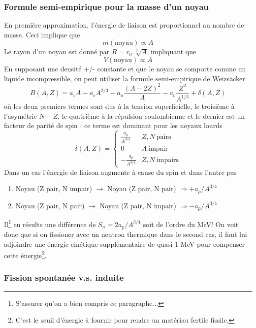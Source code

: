 \subsubsection{Formule semi-empirique  pour la masse d'un noyau}
En première approximation, l'énergie de liaison est proportionnel au nombre de masse. Ceci implique 
que 
$$m(\text{noyau}) \propto A$$
Le rayon d'un noyau est donné par $R=r_0.\sqrt[3]{A}$ impliquant que
$$V(\text{noyau}) \propto A$$
En supposant une densité +/- constante et que le noyau se comporte comme un liquide incompressible, 
on peut utiliser la formule semi-empirique de Weizsäcker
\begin{equation}
B(A,Z) = {a_v}A - {a_s}{A^{2/3}} - {a_a}\frac{{{{(A - 2Z)}^2}}}{A} - {a_c}\frac{{{Z^2}}}{{{A^{1/3}}}} + \delta (A,Z)
\end{equation}
où les deux premiers termes sont dus à la tension superficielle, le troisième à l'asymétrie $N-Z$, le quatrième
à la répulsion coulombienne et le dernier est un facteur de parité de spin : ce terme est dominant 
pour les noyaux lourds
\begin{equation}
\delta(A,Z) = \left\{\begin{array}{ll}
\frac{a_p}{A^{3/4}} & Z, N\ \text{pairs}\\
0 & A\ \text{impair}\\
-\frac{a_p}{A^{3/4}} & Z, N\ \text{impairs}
\end{array}\right.
\end{equation}
Dans un cas l'énergie de liaison augmente à cause du spin et dans l'autre pas
\begin{enumerate}
\item Noyau (Z pair, N impair) $\to$ Noyau (Z pair, N pair) $\Rightarrow +a_p/A^{3/4}$
\item Noyau (Z pair, N pair) $\to$ Noyau (Z pair, N impair) $\Rightarrow -a_p/A^{3/4}$
\end{enumerate}
Il\footnote{S'assurer qu'on a bien compris ce paragraphe...}
 en résulte une différence de $S_n = 2a_p/A^{3/4}$ soit de l'ordre du MeV! On voit donc 
que si on fissioner avec un neutron thermique dans le second cas, il faut lui adjoindre une énergie cinétique 
supplémentaire de quasi 1 MeV pour compenser cette énergie\footnote{C'est le seuil d'énergie à fournir 
pour rendre un matériau fertile fissile.}. 



\subsubsection{Fission spontanée v.s. induite}
